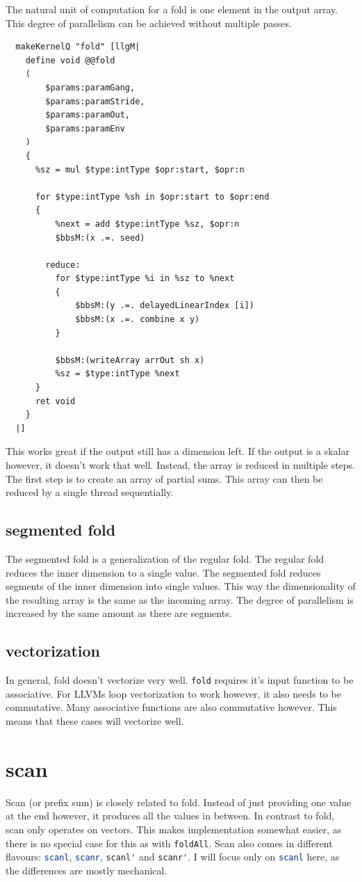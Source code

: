 \documentclass[a4paper,bibliography=totocnumbered,parskip,headsepline]{scrbook}
\begin{document}
The natural unit of computation for a fold is one element in the output array.
This degree of parallelism can be achieved without multiple passes.
\begin{lstlisting}
  makeKernelQ "fold" [llgM|
    define void @@fold
    (
        $params:paramGang,
        $params:paramStride,
        $params:paramOut,
        $params:paramEnv
    )
    {
      %sz = mul $type:intType $opr:start, $opr:n

      for $type:intType %sh in $opr:start to $opr:end
      {
          %next = add $type:intType %sz, $opr:n
          $bbsM:(x .=. seed)

        reduce:
          for $type:intType %i in %sz to %next
          {
              $bbsM:(y .=. delayedLinearIndex [i])
              $bbsM:(x .=. combine x y)
          }

          $bbsM:(writeArray arrOut sh x)
          %sz = $type:intType %next
      }
      ret void
    }
  |]
\end{lstlisting}
This works great if the output still has a dimension left.
If the output is a skalar however, it doesn't work that well.
Instead, the array is reduced in multiple steps.
The first step is to create an array of partial sums.
This array can then be reduced by a single thread sequentially.

\subsection{segmented fold}
The segmented fold is a generalization of the regular fold.
The regular fold reduces the inner dimension to a single value.
The segmented fold reduces segments of the inner dimension into single values.
This way the dimensionality of the resulting array is the same as the incoming array.
The degree of parallelism is increased by the same amount as there are segments.

\subsection{vectorization}
In general, fold doesn't vectorize very well.
\lstinline[language=haskell]!fold! requires it's input function to be associative.
For LLVMs loop vectorization to work however, it also needs to be commutative.
Many associative functions are also commutative however.
This means that these cases will vectorize well.

\section{scan}
Scan (or prefix sum) is closely related to fold.
Instead of just providing one value at the end however, it produces all the values in between.
In contrast to fold, scan only operates on vectors.
This makes implementation somewhat easier, as there is no special case for this as with \lstinline[language=haskell]!foldAll!.
Scan also comes in different flavours: \lstinline[language=haskell]!scanl!, \lstinline[language=haskell]!scanr!, \lstinline[language=haskell]!scanl'! and \lstinline[language=haskell]!scanr'!.
I will focus only on \lstinline[language=haskell]!scanl! here, as the differences are mostly mechanical.
\end{document}
